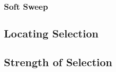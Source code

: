\subsubsection{Soft Sweep}

\subsection{Locating Selection}

\subsection{Strength of  Selection}






%
%
%
